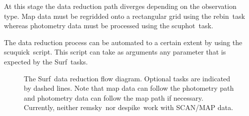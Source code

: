 \documentclass[twoside,11pt]{article}
\newcommand{\scusoft}          {{\sc Surf}}
\newcommand{\task}[1]{{\sf #1}}
\newcommand{\rebin}{\htmlref{\task{rebin}}{REBIN}}
\newcommand{\scuphot}{\htmlref{\task{scuphot}}{SCUPHOT}}
\newcommand{\scuquick}{\htmlref{\task{scuquick}}{SCUQUICK}}
\newcommand{\remsky}{\htmlref{\task{remsky}}{REMSKY}}
\newcommand{\despike}{\htmlref{\task{despike}}{DESPIKE}}
\newcommand{\htmlref}[2]{#1}
\newcommand{\htmlimage}[1]{}
\begin{document}
At this stage the data reduction path diverges depending on the observation
type. Map data must be regridded onto a rectangular grid using the \rebin\
task whereas photometry data must be processed using the \scuphot\ task.

The data reduction process can be automated to a certain extent by using the 
\scuquick{}ript. This script can take as arguments any parameter that is
expected by the \scusoft\ tasks.

\begin{figure}
\htmlimage{scale=0.9}
\caption{The \scusoft\ data reduction flow diagram. Optional tasks are
indicated by dashed lines. Note that map data can follow the photometry
path and photometry data can follow the map path if necessary. Currently,
neither \remsky\ nor \despike\ work with SCAN/MAP data.}
\label{flowpath}
\end{figure}
\end{document}
